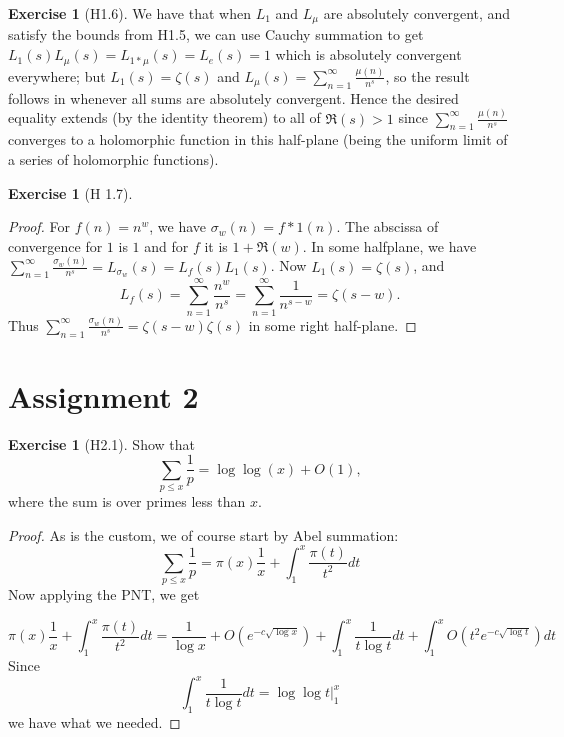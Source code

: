 \documentclass[reqno]{amsart}
\theoremstyle{definition}
\newtheorem{exercise}[theorem]{Exercise}
\theoremstyle{remark}
\begin{document}
    \begin{exercise}[H1.6]
        We have that
        when $L_1$ and $L_{\mu}$ are absolutely convergent,
        and satisfy the bounds
        from H1.5,
        we can use Cauchy summation to get
        $L_{1}(s) L_{\mu}(s) = 
        L_{1 * \mu}(s) =
        L_{e}(s)
        = 1$ which is absolutely
        convergent everywhere; but
        $L_1(s) = \zeta(s)$ and
        $L_{\mu}(s) = \sum_{n=1}^{\infty} \frac{\mu(n)}{n^{s}}$, 
        so
        the result follows in whenever all sums
        are absolutely convergent. Hence
        the desired equality extends (by the identity
        theorem) to all
        of $\Re (s) > 1$ since
        $\sum_{n=1}^{\infty} \frac{\mu(n)}{n^{s}} $ 
        converges to a holomorphic function in this
        half-plane (being the uniform limit of a 
        series of holomorphic
        functions).
    \end{exercise}


    \begin{exercise}[H 1.7]
        \begin{proof}
            For $f(n) = n^{w}$, we have
            $\sigma_w (n) = f * 1 (n)$.
            The abscissa of convergence for
            $1$ is $1$ and for $f$ it is
            $1 + \Re (w)$. In some
            halfplane, we have
            $\sum_{n=1}^{\infty} \frac{\sigma_w (n)}{n^{s}}
            = L_{\sigma_w}(s)
            = L_{f}(s) L_{1}(s)$. Now
            $L_1 (s) = \zeta(s)$, and
            \[
            L_f(s) = 
            \sum_{n=1}^{\infty} \frac{n^{w}}{n^{s}}
            = \sum_{n=1}^{\infty}
            \frac{1}{n^{s-w}}
            = \zeta(s-w).
            \] 
            Thus
            $\sum_{n=1}^{\infty} \frac{\sigma_w(n)}{n^{s}}
            = \zeta(s-w) \zeta(s)$
            in some right half-plane.
        \end{proof}
    \end{exercise}


\section{Assignment 2}

\begin{exercise}[H2.1]
    Show that
    \[
    \sum_{p\le x} \frac{1}{p}
    = \log \log (x) + O(1),
    \] 
    where the sum is over primes less than
    $x$.
\end{exercise}

\begin{proof}
    As is the custom, we of course start by Abel summation:
    \[
    \sum_{p\le x} \frac{1}{p}
    = \pi(x) \frac{1}{x}
    +\int_{1}^{x} \frac{\pi(t)}{t^2} dt
    \] 
    Now applying the PNT, we get

    \[
    \pi(x) \frac{1}{x} + 
    \int_{1}^{x} \frac{\pi(t)}{t^2} dt
    = \frac{1}{\log x} +
    O\left( e^{-c \sqrt{\log x} } \right) 
    + \int_{1}^{x} \frac{1}{t \log t}dt
    + \int_{1}^{x} O\left( t^2 e^{-c \sqrt{\log t} } \right) dt 
    \] 
    Since
    \[
    \int_{1}^{x} \frac{1}{t \log t}dt
    = \log \log t  \bigg|_{1}^{x}
    \] 
    we have what we needed.

\end{proof}
\end{document}
